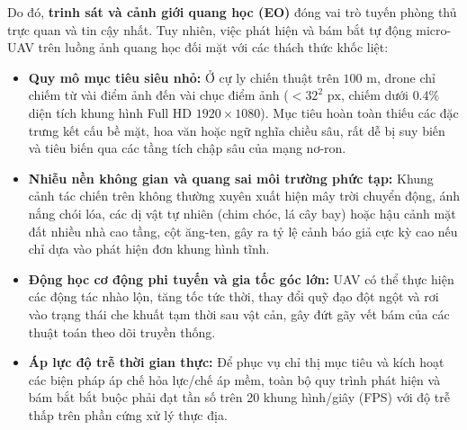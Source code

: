\documentclass[11pt,a4paper]{article}
\begin{document}
Do đó, \textbf{trinh sát và cảnh giới quang học (EO)} đóng vai trò tuyến phòng thủ trực quan và tin cậy nhất. Tuy nhiên, việc phát hiện và bám bắt tự động micro-UAV trên luồng ảnh quang học đối mặt với các thách thức khốc liệt:
\begin{itemize}
    \item \textbf{Quy mô mục tiêu siêu nhỏ:} Ở cự ly chiến thuật trên $100\text{ m}$, drone chỉ chiếm từ vài điểm ảnh đến vài chục điểm ảnh ($< 32^2\text{ px}$, chiếm dưới $0.4\%$ diện tích khung hình Full HD $1920 \times 1080$). Mục tiêu hoàn toàn thiếu các đặc trưng kết cấu bề mặt, hoa văn hoặc ngữ nghĩa chiều sâu, rất dễ bị suy biến và tiêu biến qua các tầng tích chập sâu của mạng nơ-ron.
    \item \textbf{Nhiễu nền không gian và quang sai môi trường phức tạp:} Khung cảnh tác chiến trên không thường xuyên xuất hiện mây trời chuyển động, ánh nắng chói lóa, các dị vật tự nhiên (chim chóc, lá cây bay) hoặc hậu cảnh mặt đất nhiều nhà cao tầng, cột ăng-ten, gây ra tỷ lệ cảnh báo giả cực kỳ cao nếu chỉ dựa vào phát hiện đơn khung hình tĩnh.
    \item \textbf{Động học cơ động phi tuyến và gia tốc góc lớn:} UAV có thể thực hiện các động tác nhào lộn, tăng tốc tức thời, thay đổi quỹ đạo đột ngột và rơi vào trạng thái che khuất tạm thời sau vật cản, gây đứt gãy vết bám của các thuật toán theo dõi truyền thống.
    \item \textbf{Áp lực độ trễ thời gian thực:} Để phục vụ chỉ thị mục tiêu và kích hoạt các biện pháp áp chế hỏa lực/chế áp mềm, toàn bộ quy trình phát hiện và bám bắt bắt buộc phải đạt tần số trên 20 khung hình/giây (FPS) với độ trễ thấp trên phần cứng xử lý thực địa.
\end{itemize}
\end{document}
